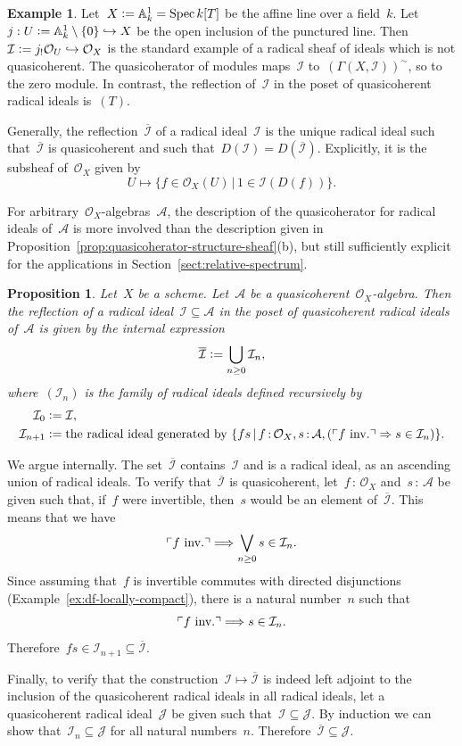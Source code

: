 \documentclass[10pt,reqno,a4paper]{amsbook}
\makeatletter
\theoremstyle{definition}
\newtheorem{ex}[defn]{Example}
\theoremstyle{plain}
\newtheorem{prop}[defn]{Proposition}
\theoremstyle{remark}
\renewcommand{\AA}{\mathbb{A}}
\newcommand{\A}{\mathcal{A}}
\renewcommand{\O}{\mathcal{O}}
\newcommand{\I}{\mathcal{I}}
\newcommand{\J}{\mathcal{J}}
\DeclareMathOperator{\Spec}{Spec}
\newcommand{\?}{\,{:}\,}
\renewcommand{\_}{\mathpunct{.}\,}
\newcommand{\speak}[1]{\ulcorner\text{\textnormal{#1}}\urcorner}
\newcommand{\inv}{inv.\@}
\newcommand{\defeq}{\vcentcolon=}
\renewenvironment{proof}[1][\proofname]{\par
  \pushQED{\qed}%
  \normalfont \topsep6\p@\@plus6\p@\relax
  \trivlist
  \item[\hskip\labelsep
        \itshape
    #1\@addpunct{.}]\ignorespaces
}{%
  \popQED\endtrivlist\@endpefalse
}
\makeatother
\begin{document}
\begin{ex}\label{ex:quasicoherator-of-ideals}
Let~$X \defeq \AA^1_k = \Spec k[T]$ be the affine line over a field~$k$.
Let~$j : U \defeq \AA^1_k \setminus \{ 0 \} \hookrightarrow X$ be the open inclusion
of the punctured line. Then~$\I \defeq j_! \O_U \hookrightarrow
\O_X$ is the standard example of a radical sheaf of ideals which is not
quasicoherent. The quasicoherator of modules maps~$\I$
to~$(\Gamma(X,\I))^\sim$, so to the zero module. In contrast, the reflection
of~$\I$ in the poset of quasicoherent radical ideals is~$(T)$.
\end{ex}

Generally, the reflection~$\overline{\I}$ of a radical ideal~$\I$ is the unique
radical ideal such that~$\overline{\I}$ is quasicoherent and such that~$D(\I) =
D(\overline{\I})$. Explicitly, it is the subsheaf of~$\O_X$ given by
\[ U \longmapsto \{ f \in \O_X(U) \,|\, 1 \in \I(D(f)) \}. \]

For arbitrary~$\O_X$-algebras~$\A$, the description of the quasicoherator for
radical ideals of~$\A$ is more involved than the description given in
Proposition~\ref{prop:quasicoherator-structure-sheaf}(b), but still
sufficiently explicit for the applications in
Section~\ref{sect:relative-spectrum}.

\begin{prop}\label{prop:quasicoherator-arbitrary-algebra}
Let~$X$ be a scheme. Let~$\A$ be a quasicoherent~$\O_X$-algebra.
Then the reflection of a radical ideal~$\I \subseteq \A$ in the poset of
quasicoherent radical ideals of~$\A$ is given by the internal expression
\[ \overline{\I} \defeq \bigcup_{n \geq 0} \I_n, \]
where~$(\I_n)$ is the family of radical ideals defined recursively by
\begin{align*}
  \I_0 &\defeq \I, \\
  \I_{n+1} &\defeq \textnormal{the radical ideal generated by
  $\{ fs \,|\, f\?\O_X, s\?\A, (\speak{$f$ \inv} \Rightarrow s \in \I_n) \}$}.
\end{align*}
\end{prop}
\begin{proof}We argue internally. The set~$\overline{\I}$ contains~$\I$ and is
a radical ideal, as an ascending union of radical ideals. To verify
that~$\overline{\I}$ is quasicoherent, let~$f\?\O_X$ and~$s\?\A$ be given such
that, if~$f$ were invertible, then~$s$ would be an element of~$\overline{\I}$.
This means that we have
\[ \speak{$f$ \inv} \Longrightarrow \bigvee_{n \geq 0} s \in \I_n. \]
Since assuming that~$f$ is invertible commutes with directed disjunctions
(Example~\ref{ex:df-locally-compact}), there is a natural number~$n$ such that
\[ \speak{$f$ \inv} \Longrightarrow s \in \I_n. \]
Therefore~$fs \in \I_{n+1} \subseteq \overline{\I}$.

Finally, to verify that the construction~$\I \mapsto \overline{\I}$ is indeed
left adjoint to the inclusion of the quasicoherent radical ideals in all
radical ideals, let a quasicoherent radical ideal~$\J$ be given such that~$\I
\subseteq \J$. By induction we can show that~$\I_n \subseteq \J$ for all
natural numbers~$n$. Therefore~$\overline{\I} \subseteq \J$.
\end{proof}
\end{document}
